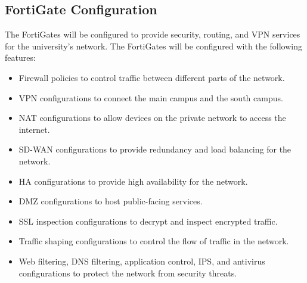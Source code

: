 \documentclass[12pt]{report}
\begin{document}
\subsection{FortiGate Configuration}
The FortiGates will be configured to provide security, routing, and VPN services for the university's network. The FortiGates will be configured with the following features:
\begin{itemize}
    \item Firewall policies to control traffic between different parts of the network.
    \item VPN configurations to connect the main campus and the south campus.
    \item NAT configurations to allow devices on the private network to access the internet.
    \item SD-WAN configurations to provide redundancy and load balancing for the network.
    \item HA configurations to provide high availability for the network.
    \item DMZ configurations to host public-facing services.
    \item SSL inspection configurations to decrypt and inspect encrypted traffic.
    \item Traffic shaping configurations to control the flow of traffic in the network.
    \item Web filtering, DNS filtering, application control, IPS, and antivirus configurations to protect the network from security threats.
\end{itemize}
\end{document}
